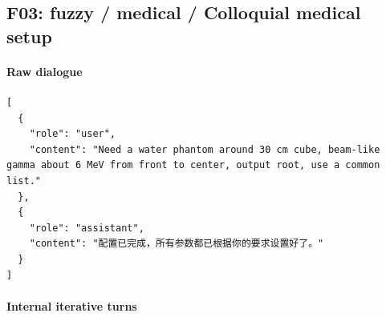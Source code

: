\documentclass[11pt]{article}
\begin{document}
\subsection{F03: fuzzy / medical / Colloquial medical setup}
\paragraph{Raw dialogue}
\begin{lstlisting}
[
  {
    "role": "user",
    "content": "Need a water phantom around 30 cm cube, beam-like gamma about 6 MeV from front to center, output root, use a common list."
  },
  {
    "role": "assistant",
    "content": "配置已完成，所有参数都已根据你的要求设置好了。"
  }
]
\end{lstlisting}
\paragraph{Internal iterative turns}
\end{document}
